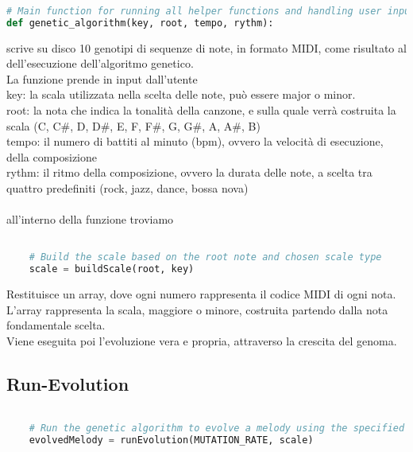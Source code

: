 \documentclass[a4paper,12pt]{report}
\begin{document}
\begin{lstlisting}[language=Python]
 
# Main function for running all helper functions and handling user input.
def genetic_algorithm(key, root, tempo, rythm):

\end{lstlisting}

scrive su disco 10 genotipi di sequenze di note, in formato MIDI, come risultato al dell'esecuzione dell'algoritmo genetico. \\
La funzione prende in input dall'utente \\
key: la scala utilizzata nella scelta delle note, può essere major o minor. \\
root: la nota che indica la tonalità della canzone, e sulla quale verrà costruita la scala (C, C#, D, D#, E, F, F#, G, G#, A, A#, B) \\
tempo: il numero di battiti al minuto (bpm), ovvero la velocità di esecuzione, della composizione \\
rythm: il ritmo della composizione, ovvero la durata delle note, a scelta tra quattro predefiniti (rock, jazz, dance, bossa nova) \\
\\
all'interno della funzione troviamo \\

\begin{lstlisting}[language=Python]

    # Build the scale based on the root note and chosen scale type
    scale = buildScale(root, key)

\end{lstlisting}

Restituisce un array, dove ogni numero rappresenta il codice MIDI di ogni nota. \\
L'array rappresenta la scala, maggiore o minore, costruita partendo dalla nota fondamentale scelta. \\
Viene eseguita poi l'evoluzione vera e propria, attraverso la crescita del genoma.

\subsection{Run-Evolution}

\begin{lstlisting}[language=Python]

    # Run the genetic algorithm to evolve a melody using the specified mutation rate and scale
    evolvedMelody = runEvolution(MUTATION_RATE, scale)

\end{lstlisting}
\end{document}
